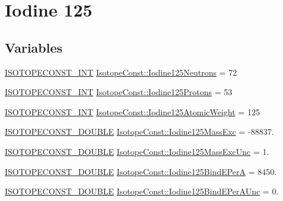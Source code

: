\hypertarget{group___isotope_const-_iodine-_i125}{}\section{Iodine 125}
\label{group___isotope_const-_iodine-_i125}
\subsection*{Variables}
\begin{DoxyCompactItemize}
\item 
\mbox{\hyperlink{group___isotope_const-_macros_ga5f18360b3e99483a35c32d789e62621c}{I\+S\+O\+T\+O\+P\+E\+C\+O\+N\+S\+T\+\_\+\+I\+NT}} \mbox{\hyperlink{group___isotope_const-_iodine-_i125_gaa21981d81f7d9daaf3c9457f76a690b9}{Isotope\+Const\+::\+Iodine125\+Neutrons}} = 72
\item 
\mbox{\hyperlink{group___isotope_const-_macros_ga5f18360b3e99483a35c32d789e62621c}{I\+S\+O\+T\+O\+P\+E\+C\+O\+N\+S\+T\+\_\+\+I\+NT}} \mbox{\hyperlink{group___isotope_const-_iodine-_i125_gad9cf776e9efcf5bd2199c9e498a6568a}{Isotope\+Const\+::\+Iodine125\+Protons}} = 53
\item 
\mbox{\hyperlink{group___isotope_const-_macros_ga5f18360b3e99483a35c32d789e62621c}{I\+S\+O\+T\+O\+P\+E\+C\+O\+N\+S\+T\+\_\+\+I\+NT}} \mbox{\hyperlink{group___isotope_const-_iodine-_i125_ga4a523cbe67af7104be57edfcb398c267}{Isotope\+Const\+::\+Iodine125\+Atomic\+Weight}} = 125
\item 
\mbox{\hyperlink{group___isotope_const-_macros_ga8f45a7272ce02c0b4c65c44636ed719a}{I\+S\+O\+T\+O\+P\+E\+C\+O\+N\+S\+T\+\_\+\+D\+O\+U\+B\+LE}} \mbox{\hyperlink{group___isotope_const-_iodine-_i125_gae38e16bbc5dc2eaed785f562cabeb0bb}{Isotope\+Const\+::\+Iodine125\+Mass\+Exc}} = -\/88837.
\item 
\mbox{\hyperlink{group___isotope_const-_macros_ga8f45a7272ce02c0b4c65c44636ed719a}{I\+S\+O\+T\+O\+P\+E\+C\+O\+N\+S\+T\+\_\+\+D\+O\+U\+B\+LE}} \mbox{\hyperlink{group___isotope_const-_iodine-_i125_ga39cab9ef613f90d085ddea987694f331}{Isotope\+Const\+::\+Iodine125\+Mass\+Exc\+Unc}} = 1.
\item 
\mbox{\hyperlink{group___isotope_const-_macros_ga8f45a7272ce02c0b4c65c44636ed719a}{I\+S\+O\+T\+O\+P\+E\+C\+O\+N\+S\+T\+\_\+\+D\+O\+U\+B\+LE}} \mbox{\hyperlink{group___isotope_const-_iodine-_i125_ga9e6cf6f1f09edd843df0bb3efd68a599}{Isotope\+Const\+::\+Iodine125\+Bind\+E\+PerA}} = 8450.
\item 
\mbox{\hyperlink{group___isotope_const-_macros_ga8f45a7272ce02c0b4c65c44636ed719a}{I\+S\+O\+T\+O\+P\+E\+C\+O\+N\+S\+T\+\_\+\+D\+O\+U\+B\+LE}} \mbox{\hyperlink{group___isotope_const-_iodine-_i125_ga335b1224cc0bcce390d2c82f1d8d2ebe}{Isotope\+Const\+::\+Iodine125\+Bind\+E\+Per\+A\+Unc}} = 0.

\end{DoxyCompactItemize}
